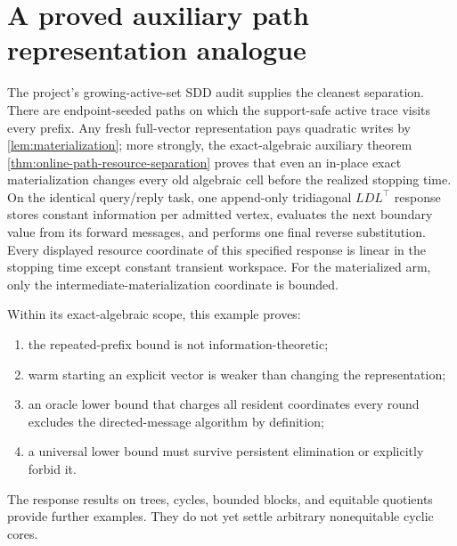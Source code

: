 \section{A proved auxiliary path representation analogue}
\label{sec:path-separation}

The project's growing-active-set SDD audit supplies the cleanest separation.
There are endpoint-seeded paths on which the support-safe active trace visits
every prefix.  Any fresh full-vector representation pays quadratic writes by
\cref{lem:materialization}; more strongly, the exact-algebraic auxiliary
theorem \cref{thm:online-path-resource-separation} proves that even an in-place
exact materialization changes every old algebraic cell before the realized
stopping time.  On the identical query/reply task, one append-only tridiagonal
$LDL^\top$ response stores constant information per admitted vertex, evaluates
the next boundary value from its forward messages, and performs one final
reverse substitution.  Every displayed resource coordinate of this specified
response is linear in the stopping time except constant transient workspace.
For the materialized arm, only the intermediate-materialization coordinate is
bounded.

Within its exact-algebraic scope, this example proves:

\begin{enumerate}
\item the repeated-prefix bound is not information-theoretic;
\item warm starting an explicit vector is weaker than changing the
      representation;
\item an oracle lower bound that charges all resident coordinates every round
      excludes the directed-message algorithm by definition;
\item a universal lower bound must survive persistent elimination or explicitly
      forbid it.
\end{enumerate}

The response results on trees, cycles, bounded blocks, and equitable quotients
provide further examples.  They do not yet settle arbitrary nonequitable
cyclic cores.
